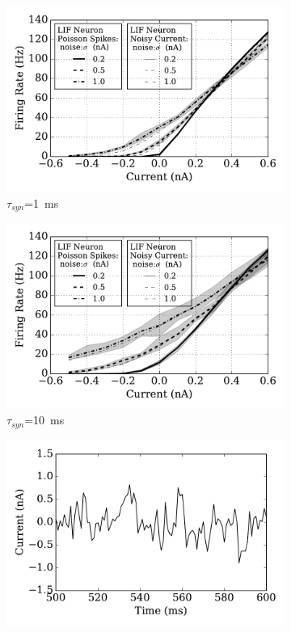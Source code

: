 	\begin{figure}
		\centering
		\begin{subfigure}[t]{0.49\textwidth}
			\includegraphics[width=\textwidth]{pics_iconip/spiked_curve_1.pdf}
			\caption{$\tau_{syn}$=1~ms}
		\end{subfigure}
		\begin{subfigure}[t]{0.49\textwidth}
			\includegraphics[width=\textwidth]{pics_iconip/spiked_curve_10.pdf}
			\caption{$\tau_{syn}$=10~ms}
		\end{subfigure}
		\begin{subfigure}[t]{0.49\textwidth}
			\includegraphics[width=\textwidth]{pics_iconip/curr_tau1.pdf}

\end{subfigure}
\end{figure}
